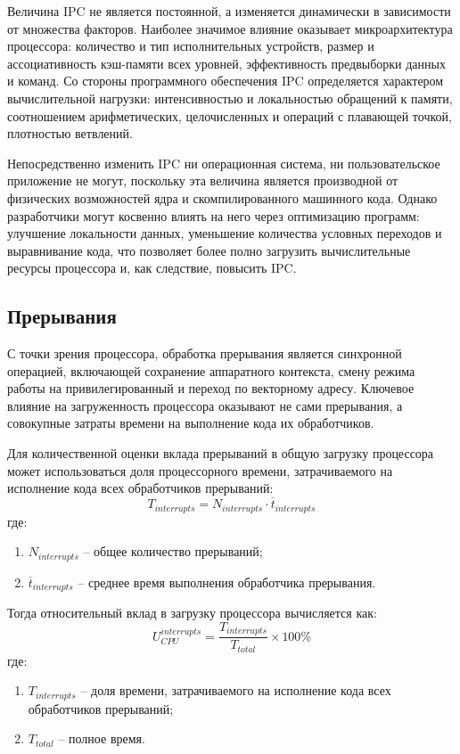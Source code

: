 Величина IPC не является постоянной, а изменяется динамически в зависимости от множества факторов. Наиболее значимое влияние оказывает микроархитектура процессора: количество и тип исполнительных устройств, размер и ассоциативность кэш-памяти всех уровней, эффективность предвыборки данных и команд. Со стороны программного обеспечения IPC определяется характером вычислительной нагрузки: интенсивностью и локальностью обращений к памяти, соотношением арифметических, целочисленных и операций с плавающей точкой, плотностью ветвлений.

Непосредственно изменить IPC ни операционная система, ни пользовательское приложение не могут, поскольку эта величина является производной от физических возможностей ядра и скомпилированного машинного кода. Однако разработчики могут косвенно влиять на него через оптимизацию программ: улучшение локальности данных, уменьшение количества условных переходов и выравнивание кода, что позволяет более полно загрузить вычислительные ресурсы процессора и, как следствие, повысить IPC.

\subsection{Прерывания}

С точки зрения процессора, обработка прерывания является синхронной операцией, включающей сохранение аппаратного контекста, смену режима работы на привилегированный и переход по векторному адресу. Ключевое влияние на загруженность процессора оказывают не сами прерывания, а совокупные затраты времени на выполнение кода их обработчиков.

Для количественной оценки вклада прерываний в общую загрузку процессора может использоваться доля процессорного времени, затрачиваемого на исполнение кода всех обработчиков прерываний:
\begin{equation}
	T_{interrupts} = N_{interrupts} \cdot \overline{t}_{interrupts}
\end{equation}
где:
\begin{enumerate}
	\item $N_{interrupts}$ -- общее количество прерываний;
	\item $\overline{t}_{interrupts}$ -- среднее время выполнения обработчика прерывания.
\end{enumerate}

Тогда относительный вклад в загрузку процессора вычисляется как:
\begin{equation}
	U_{CPU}^{interrupts} = \frac{T_{interrupts}}{T_{total}} \times 100\%
\end{equation}
где:
\begin{enumerate}
	\item $T_{interrupts}$ -- доля времени, затрачиваемого на исполнение кода всех обработчиков прерываний;
	\item $T_{total}$ -- полное время.
\end{enumerate}

